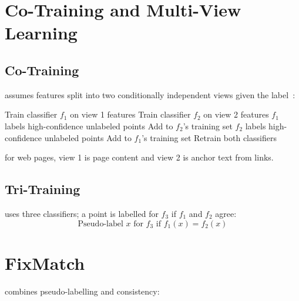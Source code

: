 \section{Co-Training and Multi-View Learning}


\subsection{Co-Training}

 assumes features split into two conditionally independent views given the label~\cite{Blum1998CoTraining}:

\begin{algorithm}[H]
\caption{Co-Training}
\begin{algorithmic}[1]
\State Train classifier $f_1$ on view 1 features
\State Train classifier $f_2$ on view 2 features
\Repeat
    \State $f_1$ labels high-confidence unlabeled points
    \State Add to $f_2$'s training set
    \State $f_2$ labels high-confidence unlabeled points
    \State Add to $f_1$'s training set
    \State Retrain both classifiers
\end{algorithmic}
\end{algorithm}

 for web pages, view 1 is page content and view 2 is anchor text from links.

\subsection{Tri-Training}

 uses three classifiers; a point is labelled for $f_3$ if $f_1$ and $f_2$ agree:
\begin{equation}
    \text{Pseudo-label } x \text{ for } f_3 \text{ if } f_1(x) = f_2(x)
\end{equation}


\section{FixMatch}


 combines pseudo-labelling and consistency:

